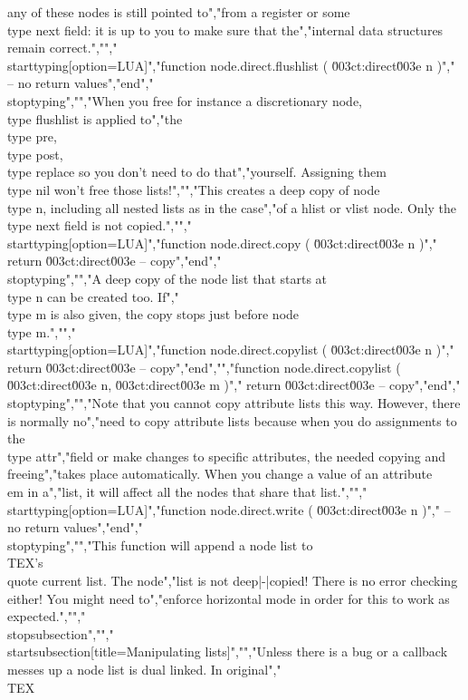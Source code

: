 any of these nodes is still pointed to","from a register or some \\type {next} field: it is up to you to make sure that the","internal data structures remain correct.","","\\starttyping[option=LUA]","function node.direct.flushlist ( \u003ct:direct\u003e n )","    -- no return values","end","\\stoptyping","","When you free for instance a discretionary node, \\type {flushlist} is applied to","the \\type {pre}, \\type {post}, \\type {replace} so you don't need to do that","yourself. Assigning them \\type {nil} won't free those lists!","","This creates a deep copy of node \\type {n}, including all nested lists as in the case","of a hlist or vlist node. Only the \\type {next} field is not copied.","","\\starttyping[option=LUA]","function node.direct.copy ( \u003ct:direct\u003e n )","    return \u003ct:direct\u003e -- copy","end","\\stoptyping","","A deep copy of the node list that starts at \\type {n} can be created too. If","\\type {m} is also given, the copy stops just before node \\type {m}.","","\\starttyping[option=LUA]","function node.direct.copylist ( \u003ct:direct\u003e n )","    return \u003ct:direct\u003e -- copy","end","","function node.direct.copylist ( \u003ct:direct\u003e n, \u003ct:direct\u003e m )","    return \u003ct:direct\u003e -- copy","end","\\stoptyping","","Note that you cannot copy attribute lists this way. However, there is normally no","need to copy attribute lists because when you do assignments to the \\type {attr}","field or make changes to specific attributes, the needed copying and freeing","takes place automatically. When you change a value of an attribute {\\em in} a","list, it will affect all the nodes that share that list.","","\\starttyping[option=LUA]","function node.direct.write ( \u003ct:direct\u003e n )","    -- no return values","end","\\stoptyping","","This function will append a node list to \\TEX's \\quote {current list}. The node","list is not deep|-|copied! There is no error checking either! You might need to","enforce horizontal mode in order for this to work as expected.","","\\stopsubsection","","\\startsubsection[title={Manipulating lists}]","","Unless there is a bug or a callback messes up a node list is dual linked. In original","\\TEX\\ 